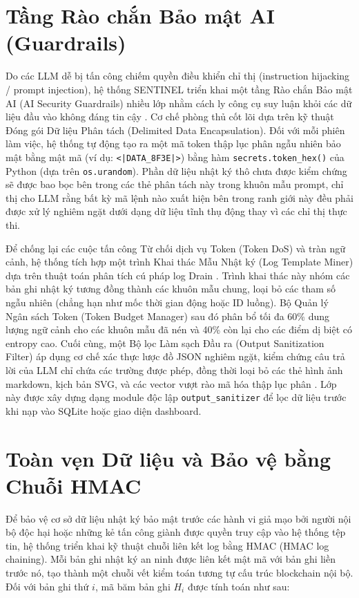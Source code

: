 \section{Tầng Rào chắn Bảo mật AI (Guardrails)}

Do các LLM dễ bị tấn công chiếm quyền điều khiển chỉ thị (instruction hijacking / prompt injection), hệ thống SENTINEL triển khai một tầng Rào chắn Bảo mật AI (AI Security Guardrails) nhiều lớp nhằm cách ly công cụ suy luận khỏi các dữ liệu đầu vào không đáng tin cậy \cite{promptinjection2023}. Cơ chế phòng thủ cốt lõi dựa trên kỹ thuật Đóng gói Dữ liệu Phân tách (Delimited Data Encapsulation). Đối với mỗi phiên làm việc, hệ thống tự động tạo ra một mã token thập lục phân ngẫu nhiên bảo mật bằng mật mã (ví dụ: \texttt{<|DATA\_8F3E|>}) bằng hàm \texttt{secrets.token\_hex()} của Python (dựa trên \texttt{os.urandom}). Phần dữ liệu nhật ký thô chưa được kiểm chứng sẽ được bao bọc bên trong các thẻ phân tách này trong khuôn mẫu prompt, chỉ thị cho LLM rằng bất kỳ mã lệnh nào xuất hiện bên trong ranh giới này đều phải được xử lý nghiêm ngặt dưới dạng dữ liệu tĩnh thụ động thay vì các chỉ thị thực thi.

Để chống lại các cuộc tấn công Từ chối dịch vụ Token (Token DoS) và tràn ngữ cảnh, hệ thống tích hợp một trình Khai thác Mẫu Nhật ký (Log Template Miner) dựa trên thuật toán phân tích cú pháp log Drain \cite{he2017drain}. Trình khai thác này nhóm các bản ghi nhật ký tương đồng thành các khuôn mẫu chung, loại bỏ các tham số ngẫu nhiên (chẳng hạn như mốc thời gian động hoặc ID luồng). Bộ Quản lý Ngân sách Token (Token Budget Manager) sau đó phân bổ tối đa 60\% dung lượng ngữ cảnh cho các khuôn mẫu đã nén và 40\% còn lại cho các điểm dị biệt có entropy cao. Cuối cùng, một Bộ lọc Làm sạch Đầu ra (Output Sanitization Filter) áp dụng cơ chế xác thực lược đồ JSON nghiêm ngặt, kiểm chứng câu trả lời của LLM chỉ chứa các trường được phép, đồng thời loại bỏ các thẻ hình ảnh markdown, kịch bản SVG, và các vector vượt rào mã hóa thập lục phân \cite{watchtower2026}. Lớp này được xây dựng dạng module độc lập \texttt{output\_sanitizer} để lọc dữ liệu trước khi nạp vào SQLite hoặc giao diện dashboard.

\section{Toàn vẹn Dữ liệu và Bảo vệ bằng Chuỗi HMAC}

Để bảo vệ cơ sở dữ liệu nhật ký bảo mật trước các hành vi giả mạo bởi người nội bộ độc hại hoặc những kẻ tấn công giành được quyền truy cập vào hệ thống tệp tin, hệ thống triển khai kỹ thuật chuỗi liên kết log bằng HMAC (HMAC log chaining). Mỗi bản ghi nhật ký an ninh được liên kết mật mã với bản ghi liền trước nó, tạo thành một chuỗi vết kiểm toán tương tự cấu trúc blockchain nội bộ. Đối với bản ghi thứ $i$, mã băm bản ghi $H_i$ được tính toán như sau:


